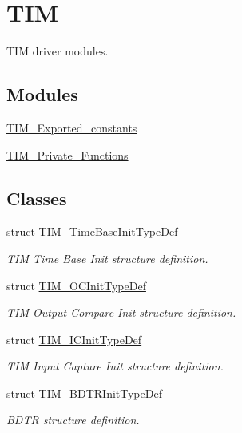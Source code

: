 \hypertarget{group___t_i_m}{}\section{T\+IM}
\label{group___t_i_m}


T\+IM driver modules.  


\subsection*{Modules}
\begin{DoxyCompactItemize}
\item 
\hyperlink{group___t_i_m___exported__constants}{T\+I\+M\+\_\+\+Exported\+\_\+constants}
\item 
\hyperlink{group___t_i_m___private___functions}{T\+I\+M\+\_\+\+Private\+\_\+\+Functions}
\end{DoxyCompactItemize}
\subsection*{Classes}
\begin{DoxyCompactItemize}
\item 
struct \hyperlink{struct_t_i_m___time_base_init_type_def}{T\+I\+M\+\_\+\+Time\+Base\+Init\+Type\+Def}
\begin{DoxyCompactList}\small\item\em T\+IM Time Base Init structure definition. \end{DoxyCompactList}\item 
struct \hyperlink{struct_t_i_m___o_c_init_type_def}{T\+I\+M\+\_\+\+O\+C\+Init\+Type\+Def}
\begin{DoxyCompactList}\small\item\em T\+IM Output Compare Init structure definition. \end{DoxyCompactList}\item 
struct \hyperlink{struct_t_i_m___i_c_init_type_def}{T\+I\+M\+\_\+\+I\+C\+Init\+Type\+Def}
\begin{DoxyCompactList}\small\item\em T\+IM Input Capture Init structure definition. \end{DoxyCompactList}\item 
struct \hyperlink{struct_t_i_m___b_d_t_r_init_type_def}{T\+I\+M\+\_\+\+B\+D\+T\+R\+Init\+Type\+Def}
\begin{DoxyCompactList}\small\item\em B\+D\+TR structure definition. \end{DoxyCompactList}\end{DoxyCompactItemize}
